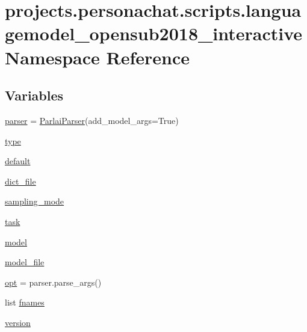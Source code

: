 \hypertarget{namespaceprojects_1_1personachat_1_1scripts_1_1languagemodel__opensub2018__interactive}{}\section{projects.\+personachat.\+scripts.\+languagemodel\+\_\+opensub2018\+\_\+interactive Namespace Reference}
\label{namespaceprojects_1_1personachat_1_1scripts_1_1languagemodel__opensub2018__interactive}
\subsection*{Variables}
\begin{DoxyCompactItemize}
\item 
\hyperlink{namespaceprojects_1_1personachat_1_1scripts_1_1languagemodel__opensub2018__interactive_aa76c1419b8143e493636a2f52f499ddb}{parser} = \hyperlink{classparlai_1_1core_1_1params_1_1ParlaiParser}{Parlai\+Parser}(add\+\_\+model\+\_\+args=True)
\item 
\hyperlink{namespaceprojects_1_1personachat_1_1scripts_1_1languagemodel__opensub2018__interactive_af9985af118825d310d4927cd29e9e5f0}{type}
\item 
\hyperlink{namespaceprojects_1_1personachat_1_1scripts_1_1languagemodel__opensub2018__interactive_a29f50d0b309eba88012286a072b741a9}{default}
\item 
\hyperlink{namespaceprojects_1_1personachat_1_1scripts_1_1languagemodel__opensub2018__interactive_a099498cad277b750be85e76af4780d48}{dict\+\_\+file}
\item 
\hyperlink{namespaceprojects_1_1personachat_1_1scripts_1_1languagemodel__opensub2018__interactive_a8c490ebf95cb3850a9516806061cb38b}{sampling\+\_\+mode}
\item 
\hyperlink{namespaceprojects_1_1personachat_1_1scripts_1_1languagemodel__opensub2018__interactive_ad9f488fe6f59e0c5777e7b9f0c813c7c}{task}
\item 
\hyperlink{namespaceprojects_1_1personachat_1_1scripts_1_1languagemodel__opensub2018__interactive_a9c0dc12d92dcacba837ee1eaece4532f}{model}
\item 
\hyperlink{namespaceprojects_1_1personachat_1_1scripts_1_1languagemodel__opensub2018__interactive_ab98c0243651214d9d6207ffa88e64bc9}{model\+\_\+file}
\item 
\hyperlink{namespaceprojects_1_1personachat_1_1scripts_1_1languagemodel__opensub2018__interactive_a3059bb9bb5a74dff0d505cd53140a28e}{opt} = parser.\+parse\+\_\+args()
\item 
list \hyperlink{namespaceprojects_1_1personachat_1_1scripts_1_1languagemodel__opensub2018__interactive_a36421f96ba72190b5a2beb59949e51e2}{fnames}
\item 
\hyperlink{namespaceprojects_1_1personachat_1_1scripts_1_1languagemodel__opensub2018__interactive_ac0f798cd57de4f16baadcc1d28678d3b}{version}
\end{DoxyCompactItemize}



